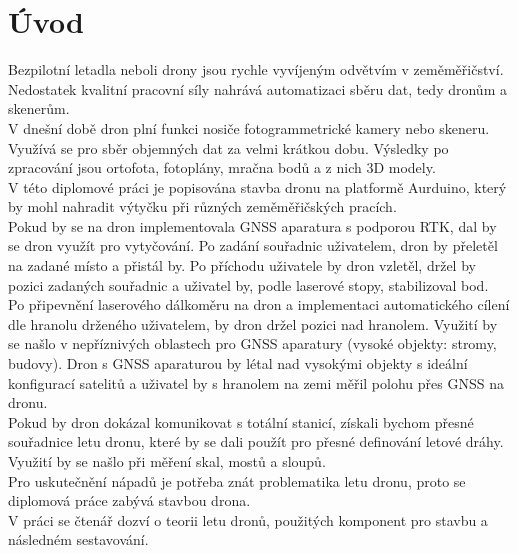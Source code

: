 \chapter{Úvod}
\label{0-uvod}


Bezpilotní letadla neboli drony jsou rychle vyvíjeným odvětvím v zeměměřičství. Nedostatek kvalitní pracovní síly nahrává automatizaci sběru dat, tedy dronům a skenerům.\\
V dnešní době dron plní funkci nosiče fotogrammetrické kamery nebo skeneru. Využívá se pro sběr objemných dat za velmi krátkou dobu. Výsledky po zpracování jsou ortofota, fotoplány, mračna bodů a z nich 3D modely.\\
V této diplomové práci je popisována stavba dronu na platformě Aurduino, který by mohl nahradit výtyčku při různých zeměměřičských pracích.\\
Pokud by se na dron implementovala GNSS aparatura s podporou RTK, dal by se dron využít pro vytyčování. Po zadání souřadnic uživatelem, dron by přeletěl na zadané místo a přistál by. Po příchodu uživatele by dron vzletěl, držel by pozici zadaných souřadnic a uživatel by, podle laserové stopy, stabilizoval bod.\\
Po připevnění laserového dálkoměru na dron a implementaci automatického cílení dle hranolu drženého uživatelem, by dron držel pozici nad hranolem. Využití by se našlo v nepříznivých oblastech pro GNSS aparatury (vysoké objekty: stromy, budovy). Dron s GNSS aparaturou by létal nad vysokými objekty s ideální konfigurací satelitů a uživatel by s hranolem na zemi měřil polohu přes GNSS na dronu.\\
Pokud by dron dokázal komunikovat s totální stanicí, získali bychom přesné souřadnice letu dronu, které by se dali použít pro přesné definování letové dráhy. Využití by se našlo při měření skal, mostů a sloupů.\\
Pro uskutečnění nápadů je potřeba znát problematika letu dronu, proto se diplomová práce zabývá stavbou drona.\\
V práci se čtenář dozví o teorii letu dronů, použitých komponent pro stavbu a následném sestavování.\\

